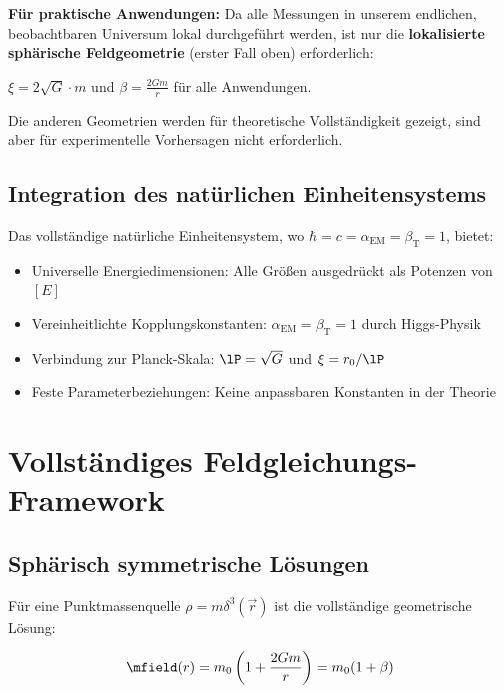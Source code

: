 	\begin{tcolorbox}[colback=yellow!5!white,colframe=orange!75!black,title=Praktische Vereinfachungsnotiz]
		\textbf{Für praktische Anwendungen:} Da alle Messungen in unserem endlichen, beobachtbaren Universum lokal durchgeführt werden, ist nur die \textbf{lokalisierte sphärische Feldgeometrie} (erster Fall oben) erforderlich:
		
		$\xi = 2\sqrt{G} \cdot m$ und $\beta = \frac{2Gm}{r}$ für alle Anwendungen.
		
		Die anderen Geometrien werden für theoretische Vollständigkeit gezeigt, sind aber für experimentelle Vorhersagen nicht erforderlich.
	\end{tcolorbox}
	
	\subsection{Integration des natürlichen Einheitensystems}
	\label{subsec:nat_einheiten_integration}
	
	Das vollständige natürliche Einheitensystem, wo $\hbar = c = \alpha_{\text{EM}} = \beta_{\text{T}} = 1$, bietet:
	\begin{itemize}
		\item Universelle Energiedimensionen: Alle Größen ausgedrückt als Potenzen von $[E]$
		\item Vereinheitlichte Kopplungskonstanten: $\alpha_{\text{EM}} = \beta_{\text{T}} = 1$ durch Higgs-Physik
		\item Verbindung zur Planck-Skala: $\lP = \sqrt{G}$ und $\xi = r_0/\lP$
		\item Feste Parameterbeziehungen: Keine anpassbaren Konstanten in der Theorie
	\end{itemize}
	
	\section{Vollständiges Feldgleichungs-Framework}
	\label{sec:feldgleichungs_framework}
	
	\subsection{Sphärisch symmetrische Lösungen}
	\label{subsec:sphaerische_loesungen}
	
	Für eine Punktmassenquelle $\rho = m \delta^3(\vec{r})$ ist die vollständige geometrische Lösung:
	
	\begin{equation}
		\mfield(r) = m_0\left(1 + \frac{2Gm}{r}\right) = m_0(1 + \beta)
		\label{eq:massenfeld_loesung}
	\end{equation}
	
